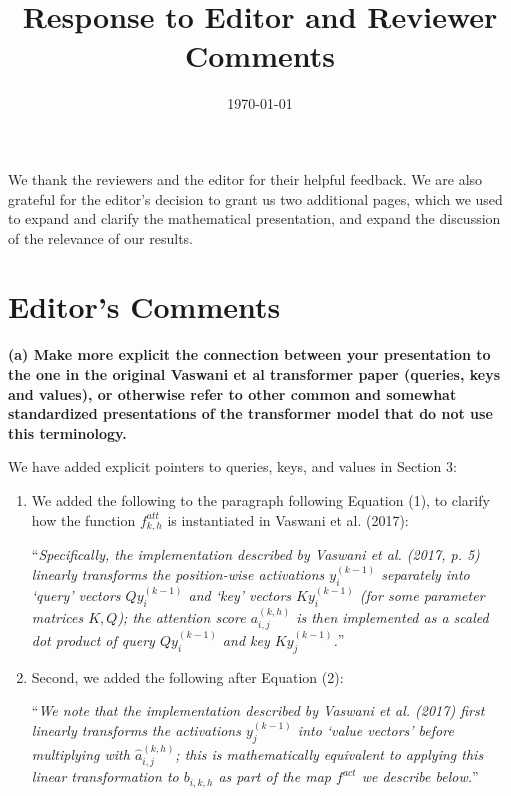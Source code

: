 \documentclass[11pt,a4paper]{article}
\title{Response to Editor and Reviewer Comments}
\date{\today}
\newcommand\response[1]{{\color{blue}#1}}
\newcommand\newtext[1]{``\textit{#1}''}
\newcommand\original[1]{\textbf{#1}}
\begin{document}
\maketitle 

\response{We thank the reviewers and the editor for their helpful feedback.
We are also grateful for the editor's decision to grant us two additional pages, which we used to expand and clarify the mathematical presentation, and expand the discussion of the relevance of our results.}

\section{Editor's Comments}

\original{(a) Make more explicit the connection between your presentation to the one
in the original Vaswani et al transformer paper (queries, keys and values),
or otherwise refer to other common and somewhat standardized presentations
of the transformer model that do not use this terminology.}

\response{We have added explicit pointers to queries, keys, and values in Section 3:}

\begin{enumerate}
    \item \response{We added the following to the paragraph following Equation (1), to clarify how the function $f^{att}_{k,h}$ is instantiated in Vaswani et al. (2017):}

\response{\newtext{Specifically, the implementation described by Vaswani et al. (2017, p. 5) linearly transforms the position-wise activations $y_i^{(k-1)}$ separately into `query' vectors $Q y_i^{(k-1)}$ and `key' vectors $K y_i^{(k-1)}$ (for some parameter matrices $K, Q$); the attention score $a_{i,j}^{(k,h)}$ is then implemented as a scaled dot product of query $Q y_i^{(k-1)}$ and key $K y_j^{(k-1)}$.}}
\newline

\item \response{Second, we added the following after Equation (2):}

\response{\newtext{We note that the implementation described by Vaswani et al. (2017) first linearly transforms the activations $y_j^{(k-1)}$ into `value vectors' before multiplying with $ \hat{a}_{i,j}^{(k,h)}$; this is mathematically equivalent to applying this linear transformation to $b_{i,k,h}$ as part of the map $f^{act}$ we describe below.}}
\end{enumerate}
\end{document}

